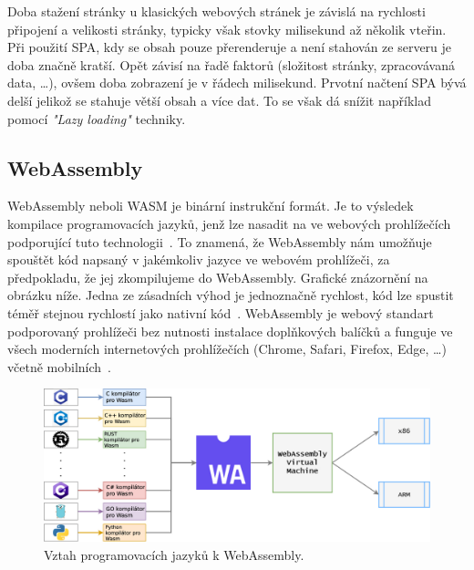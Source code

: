     Doba stažení stránky u klasických webových stránek je závislá na rychlosti připojení a velikosti stránky, typicky však stovky milisekund až několik vteřin. Při použití SPA, kdy se obsah pouze přerenderuje a není stahován ze serveru je doba značně kratší. Opět závisí na řadě faktorů (složitost stránky, zpracovávaná data, …), ovšem doba zobrazení je v řádech milisekund. Prvotní načtení SPA bývá delší jelikož se stahuje větší obsah a více dat. To se však dá snížit například pomocí \textit{"Lazy loading"} techniky. 

    \subsection{WebAssembly}
    WebAssembly neboli WASM je binární instrukční formát. Je to výsledek kompilace programovacích jazyků, jenž lze nasadit na ve webových prohlížečích podporující tuto technologii~\cite{WebAssembly}. To znamená, že WebAssembly nám umožňuje spouštět kód napsaný v jakémkoliv jazyce ve webovém prohlížeči, za předpokladu, že jej zkompilujeme do WebAssembly. Grafické znázornění na obrázku níže. Jedna ze zásadních výhod je jednoznačně rychlost, kód lze spustit téměř stejnou rychlostí jako nativní kód~\cite{WebAssembly}. WebAssembly je webový standart podporovaný prohlížeči bez nutnosti instalace doplňkových balíčků a funguje ve všech moderních internetových prohlížečích (Chrome, Safari, Firefox, Edge, …) včetně mobilních~\cite{MicrosoftBlazor}.
    
        \begin{figure}[H]
            \centering
            \includegraphics[scale=0.3]{obrazky-figures/PouziteTechnologie/wasm.jpg}
            \caption{Vztah programovacích jazyků k WebAssembly\footnotemark.}
            \label{fig:my_label}
        \end{figure}
        
